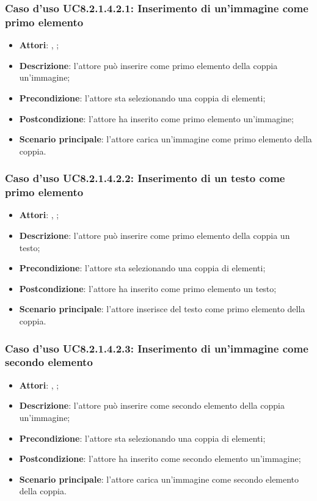 		\subsubsection{Caso d'uso UC8.2.1.4.2.1: Inserimento di un'immagine come primo elemento}
		\label{UC8.2.1.4.2.1}
		\begin{itemize}
			\item \textbf{Attori}: \uau, \uaupro;
			\item \textbf{Descrizione}: l'attore può inserire come primo elemento della coppia un'immagine;
			\item \textbf{Precondizione}: l'attore sta selezionando una coppia di elementi;
			\item \textbf{Postcondizione}: l'attore ha inserito come primo elemento un'immagine;
			\item \textbf{Scenario principale}: l'attore carica un'immagine come primo elemento della coppia.
		\end{itemize}
		
		\subsubsection{Caso d'uso UC8.2.1.4.2.2: Inserimento di un testo come primo elemento}
		\label{UC8.2.1.4.2.2}
		\begin{itemize}
			\item \textbf{Attori}: \uau, \uaupro;
			\item \textbf{Descrizione}: l'attore può inserire come primo elemento della coppia un testo;
			\item \textbf{Precondizione}: l'attore sta selezionando una coppia di elementi;
			\item \textbf{Postcondizione}: l'attore ha inserito come primo elemento un testo;
			\item \textbf{Scenario principale}: l'attore inserisce del testo come primo elemento della coppia.
		\end{itemize}
		
			\subsubsection{Caso d'uso UC8.2.1.4.2.3: Inserimento di un'immagine come secondo elemento}
		\label{UC8.2.1.4.2.3}
		\begin{itemize}
			\item \textbf{Attori}: \uau, \uaupro;
			\item \textbf{Descrizione}: l'attore può inserire come secondo elemento della coppia un'immagine;
			\item \textbf{Precondizione}: l'attore sta selezionando una coppia di elementi;
			\item \textbf{Postcondizione}: l'attore ha inserito come secondo elemento un'immagine;
			\item \textbf{Scenario principale}: l'attore carica un'immagine come secondo elemento della coppia.
		\end{itemize}
		
